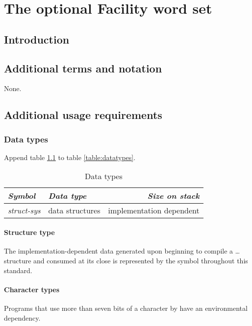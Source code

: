 
\chapter{The optional Facility word set} %

\section{Introduction} %

\section{Additional terms and notation} %
None.

\section{Additional usage requirements} %


\subsection{Data types} %

Append table \ref{facility:types} to table \ref{table:datatypes}.

\begin{table}[h]
  \begin{center}
	\caption{Data types}
	\label{facility:types}
	\begin{tabular}{llr}
	\hline\hline
	\emph{Symbol} & \emph{Data type} & \emph{Size on stack} \\
	\hline
	\emph{struct-sys}
	& data structures
	& implementation dependent \\
	\hline\hline
	\end{tabular}
  \end{center}
\end{table}

\subsubsection{Structure type} %

The implementation-dependent data generated upon beginning to compile
a  {\ldots}  structure and
consumed at its close is represented by the symbol 
throughout this standard.

\subsubsection{Character types} %
Programs that use more than seven bits of a character by
 have an environmental dependency.

